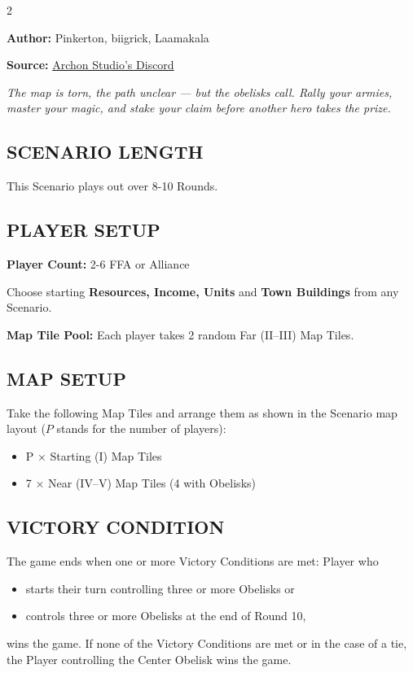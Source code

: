 
\begin{multicols*}{2}

\textbf{Author:} Pinkerton, biigrick, Laamakala

\textbf{Source:} \href{https://discord.com/channels/740870068178649108/1232319328049954826}{Archon Studio's Discord}

\textit{The map is torn, the path unclear — but the obelisks call. Rally your armies, master your magic, and stake your claim before another hero takes the prize.}  %

\subsection*{\MakeUppercase{Scenario Length}}
This Scenario plays out over 8-10 Rounds.

\subsection*{\MakeUppercase{Player Setup}}
\textbf{Player Count:} 2-6 FFA or Alliance

Choose starting \textbf{Resources, Income, Units} and \textbf{Town Buildings} from any Scenario.

\textbf{Map Tile Pool:} Each player takes 2 random Far (II--III) Map Tiles.

\subsection*{\MakeUppercase{Map Setup}}
Take the following Map Tiles and arrange them as shown in the Scenario map layout ($P$ stands for the number of players):

\begin{itemize}
  \item P × Starting (I) Map Tiles
  \item 7 × Near (IV--V) Map Tiles (4 with Obelisks)
\end{itemize}

\subsection*{\MakeUppercase{Victory Condition}}
The game ends when one or more Victory Conditions are met: Player who
\begin{itemize}
  \item starts their turn controlling three or more Obelisks or
  \item controls three or more Obelisks at the end of Round 10,
\end{itemize}
wins the game. If none of the Victory Conditions are met or in the case of a tie, the Player controlling the Center Obelisk wins the game.


\end{multicols*}
